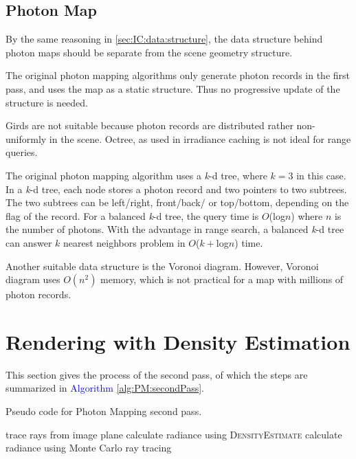 \documentclass[]{book}
\begin{document}
\subsection{Photon Map}
\label{sec:PM:data:map}
By the same reasoning in \ref{sec:IC:data:structure}, the data structure behind photon maps should be separate from the scene geometry structure.

The original photon mapping algorithms only generate photon records in the first pass, and uses the map as a static structure.
Thus no progressive update of the structure is needed.

Girds are not suitable because photon records are distributed rather non-uniformly in the scene.
Octree, as used in irradiance caching is not ideal for range queries.

The original photon mapping algorithm uses a \textit{k}-d tree, where $k=3$ in this case.
In a \textit{k}-d tree, each node stores a photon record and two pointers to two subtrees.
The two subtrees can be left/right, front/back/ or top/bottom, depending on the flag of the record.
For a balanced \textit{k}-d tree, the query time is $O$(log$n$) where $n$ is the number of photons.
With the advantage in range search, a balanced \textit{k}-d tree can answer $k$ nearest neighbors problem in $O$($k+$log$n$) time.

Another suitable data structure is the Voronoi diagram.
However, Voronoi diagram uses $O(n^2)$ memory, which is not practical for a map with millions of photon records.

\section{Rendering with Density Estimation}
\label{sec:PM:render}
This section gives the process of the second pass, of which the steps are summarized in \textcolor{blue}{Algorithm \ref{alg:PM:secondPass}}.

\begin{algorithm}
	\caption[Photon Mapping Second Pass]{Pseudo code for Photon Mapping second pass.}
	\label{alg:PM:secondPass}
	\begin{algorithmic}[1]
		\State trace rays from image plane
		\State calculate radiance using \textsc{DensityEstimate}
		\Else
		\State calculate radiance using Monte Carlo ray tracing
		\EndIf
		\EndProcedure
	\end{algorithmic}
\end{algorithm}
\end{document}
